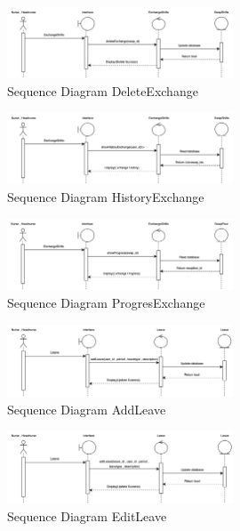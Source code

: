     \begin{figure}[h]
    \centering
    \includegraphics[width=0.6\textwidth]{Sequence 6.3.png}
    \caption{Sequence Diagram DeleteExchange}
    \end{figure}


    \begin{figure}[h]
        \centering
        \includegraphics[width=0.6\textwidth]{Sequence 6.4.png}
        \caption{Sequence Diagram HistoryExchange}
        \end{figure}
    
        \begin{figure}[h]
            \centering
            \includegraphics[width=0.6\textwidth]{Sequence 6.5.png}
            \caption{Sequence Diagram ProgresExchange}
            \end{figure}


\begin{figure}[h]
    \centering
    \includegraphics[width=0.6\textwidth]{Sequence 7.1.png}
    \caption{Sequence Diagram AddLeave}
    \end{figure}


    \begin{figure}[h]
    \centering
    \includegraphics[width=0.6\textwidth]{Sequence 7.2.png}
    \caption{Sequence Diagram EditLeave}
    \end{figure}

